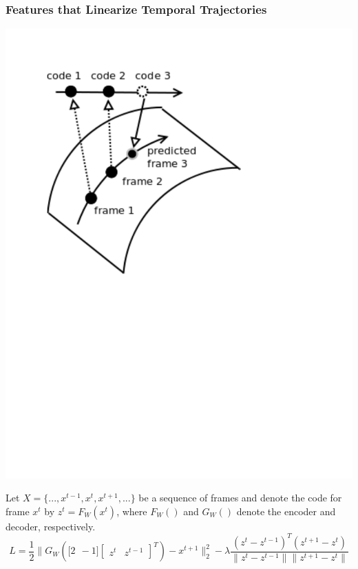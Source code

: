 \documentclass{beamer}
\begin{document}
\begin{frame} 
\frametitle{Features that Linearize Temporal Trajectories}
\begin{center} 
\includegraphics[scale=0.27, trim= 15 350 200 39, clip]{./Figures/Project2/linearize_manifold.pdf} 
\end{center} 
Let $X = \{...,x^{t-1},x^t,x^{t+1},...\}$ be a sequence of frames and denote the code for frame $x^t$ by $z^t = F_W(x^t)$, 
where $F_W()$ and $G_W()$ denote the encoder and decoder, respectively. \\
\begin{equation}
\nonumber
L = \frac{1}{2}\| G_W(\mathbf [2 ~~-1] \begin{bmatrix}z^t&z^{t-1}\end{bmatrix}^T) - x^{t+1} \|^2_2 - \lambda \frac{(z^t - z^{t-1})^T(z^{t+1} - z^t)}{\|z^t-z^{t-1}\| \|z^{t+1} - z^t\|}
\label{eqn:loss} 
\end{equation} 
\end{frame} 
\end{document}
